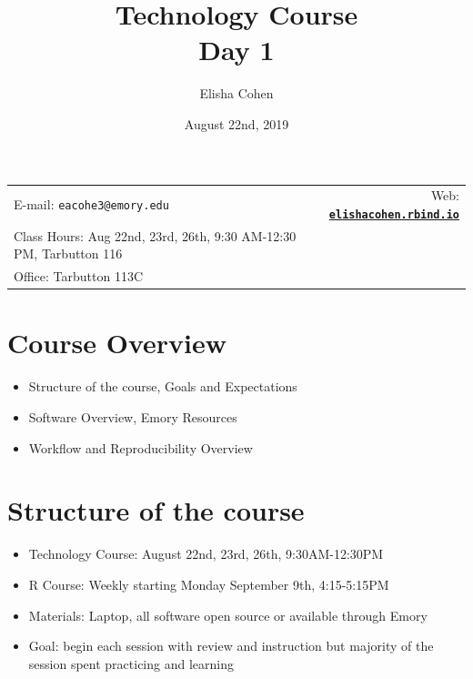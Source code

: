 \documentclass[11pt]{article}
\title{Technology Course\\Day 1}
\author{Elisha Cohen}
\date{August 22nd, 2019}
\newcommand{\blankline}{\quad\pagebreak[2]}
\begin{document}
\maketitle

\blankline

\begin{tabular*}{.93\textwidth}{@{\extracolsep{\fill}}lr}


E-mail: \texttt{eacohe3@emory.edu} & Web: \href{elishacohen.rbind.io}{\tt\bf elishacohen.rbind.io}  \\

Class Hours: Aug 22nd, 23rd, 26th, 9:30 AM-12:30 PM, Tarbutton 116 \\
Office: Tarbutton 113C\\
%
\hline
\end{tabular*}

\vspace{5 mm}


\section*{Course Overview}

\begin{itemize}
  \item Structure of the course, Goals and Expectations
  \item Software Overview, Emory Resources
  \item Workflow and Reproducibility Overview
\end{itemize}

\section*{Structure of the course}
\begin{itemize}
  \item Technology Course: August 22nd, 23rd, 26th, 9:30AM-12:30PM
  \item R Course: Weekly starting Monday September 9th, 4:15-5:15PM
  \item Materials: Laptop, all software open source or available through Emory
  \item Goal: begin each session with review and instruction but majority of the session spent practicing and learning
\end{itemize}
\end{document}
